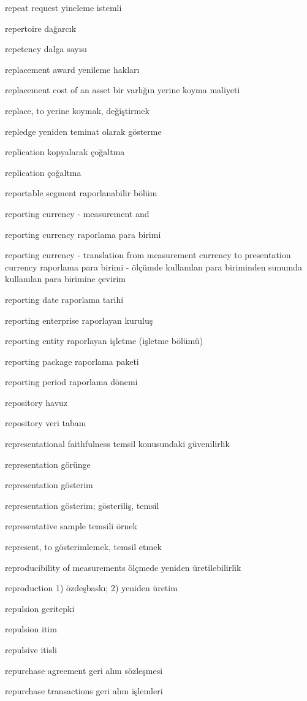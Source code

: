 \documentclass[12pt,fleqn]{article}\usepackage{../../common}
\begin{document}
repeat request yineleme istemli

repertoire dağarcık

repetency dalga sayısı

replacement award yenileme hakları

replacement cost of an asset bir varlığın yerine koyma maliyeti

replace, to yerine koymak, değiştirmek

repledge yeniden teminat olarak gösterme

replication kopyalarak çoğaltma

replication çoğaltma

reportable segment raporlanabilir bölüm

reporting currency - measurement and

reporting currency raporlama para birimi

reporting currency - translation from measurement currency to presentation currency raporlama para birimi - ölçümde kullanılan para biriminden sunumda kullanılan para birimine çevirim

reporting date raporlama tarihi

reporting enterprise raporlayan kuruluş

reporting entity raporlayan işletme (işletme bölümü)

reporting package raporlama paketi

reporting period raporlama dönemi

repository havuz

repository veri tabanı

representational faithfulness temsil konusundaki güvenilirlik

representation görünge

representation gösterim

representation gösterim; gösteriliş, temsil

representative sample temsili örnek

represent, to gösterimlemek, temsil etmek

reproducibility of measurements ölçmede yeniden üretilebilirlik

reproduction 1) özdeşbaskı; 2) yeniden üretim

repulsion geritepki

repulsion itim

repulsive itisli

repurchase agreement geri alım sözleşmesi

repurchase transactions geri alım işlemleri
\end{document}
